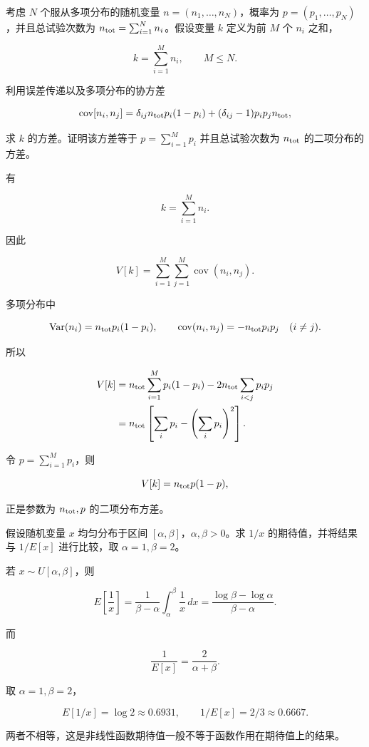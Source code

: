 ﻿


\begin{question}
考虑 \(N\) 个服从多项分布的随机变量 \(n=(n_1,\ldots,n_N)\)，概率为
\(p=(p_1,\ldots,p_N)\)，并且总试验次数为
\(n_{\rm tot}=\sum_{i=1}^{N}n_i\)。假设变量 \(k\) 定义为前 \(M\) 个
\(n_i\) 之和，

\[
k=\sum_{i=1}^{M}n_i,\qquad M\le N.
\]

利用误差传递以及多项分布的协方差

\[
\operatorname{cov}[n_i,n_j]=\delta_{ij}n_{\rm tot}p_i(1-p_i)+(\delta_{ij}-1)p_ip_jn_{\rm tot},
\]

求 \(k\) 的方差。证明该方差等于 \(p=\sum_{i=1}^{M}p_i\) 并且总试验次数为
\(n_{\rm tot}\) 的二项分布的方差。
\begin{solution}
有

\[
k=\sum_{i=1}^M n_i.
\]

因此

\[
V[k]=\sum_{i=1}^M\sum_{j=1}^M\operatorname{cov}(n_i,n_j).
\]

多项分布中

\[
\operatorname{Var}(n_i)=n_{\rm tot}p_i(1-p_i),\qquad
\operatorname{cov}(n_i,n_j)=-n_{\rm tot}p_ip_j\quad(i\ne j).
\]

所以

\[
\begin{split}
V[k]
&=n_{\rm tot}\sum_{i=1}^M p_i(1-p_i)-2n_{\rm tot}\sum_{i<j}p_ip_j\\
&=n_{\rm tot}\left[\sum_i p_i-\left(\sum_i p_i\right)^2\right].
\end{split}
\]

令 \(p=\sum_{i=1}^M p_i\)，则

\[
V[k]=n_{\rm tot}p(1-p),
\]

正是参数为 \(n_{\rm tot},p\) 的二项分布方差。
\end{solution}
\end{question}


\begin{question}
假设随机变量 \(x\) 均匀分布于区间
\([\alpha,\beta]\)，\(\alpha,\beta>0\)。求 \(1/x\) 的期待值，并将结果与
\(1/E[x]\) 进行比较，取 \(\alpha=1,\beta=2\)。
\begin{solution}
若 \(x\sim U[\alpha,\beta]\)，则

\[
E\left[\frac1x\right]=\frac{1}{\beta-\alpha}\int_\alpha^\beta\frac1x\,dx
=\frac{\log\beta-\log\alpha}{\beta-\alpha}.
\]

而

\[
\frac1{E[x]}=\frac{2}{\alpha+\beta}.
\]

取 \(\alpha=1,\beta=2\)，

\[
E[1/x]=\log2\approx0.6931,
\qquad
1/E[x]=2/3\approx0.6667.
\]

两者不相等，这是非线性函数期待值一般不等于函数作用在期待值上的结果。
\end{solution}
\end{question}


